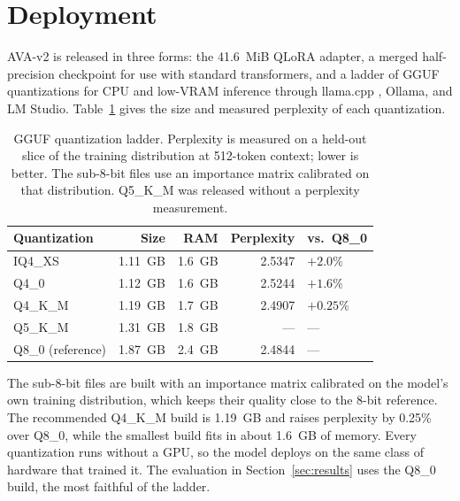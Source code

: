 \section{Deployment}
\label{sec:deploy}

AVA-v2 is released in three forms: the 41.6~MiB QLoRA adapter, a merged half-precision checkpoint for use with standard transformers, and a ladder of GGUF quantizations for CPU and low-VRAM inference through llama.cpp \citep{gerganov2023llamacpp}, Ollama, and LM Studio. Table~\ref{tab:gguf} gives the size and measured perplexity of each quantization.

\begin{table}[t]
\centering
\caption{GGUF quantization ladder. Perplexity is measured on a held-out slice of the training distribution at 512-token context; lower is better. The sub-8-bit files use an importance matrix calibrated on that distribution. Q5\_K\_M was released without a perplexity measurement.}
\label{tab:gguf}
\begin{tabular}{lrrrl}
\toprule
Quantization & Size & RAM & Perplexity & vs.\ Q8\_0 \\
\midrule
IQ4\_XS & 1.11~GB & 1.6~GB & 2.5347 & $+2.0\%$ \\
Q4\_0 & 1.12~GB & 1.6~GB & 2.5244 & $+1.6\%$ \\
Q4\_K\_M & 1.19~GB & 1.7~GB & 2.4907 & $+0.25\%$ \\
Q5\_K\_M & 1.31~GB & 1.8~GB & --- & --- \\
Q8\_0 (reference) & 1.87~GB & 2.4~GB & 2.4844 & --- \\
\bottomrule
\end{tabular}
\end{table}

The sub-8-bit files are built with an importance matrix calibrated on the model's own training distribution, which keeps their quality close to the 8-bit reference. The recommended Q4\_K\_M build is 1.19~GB and raises perplexity by 0.25\% over Q8\_0, while the smallest build fits in about 1.6~GB of memory. Every quantization runs without a GPU, so the model deploys on the same class of hardware that trained it. The evaluation in Section~\ref{sec:results} uses the Q8\_0 build, the most faithful of the ladder.
